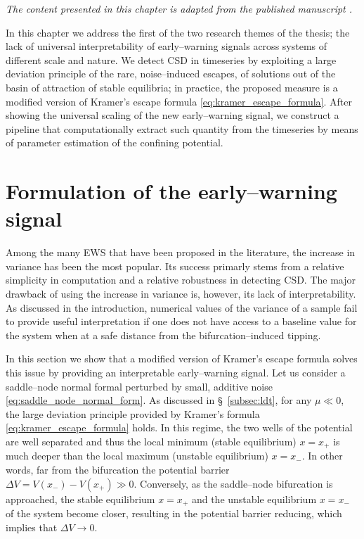 \emph{The content presented in this chapter is adapted from the published manuscript \cite{Papapicco2027}.}
\vspace{1cm}

In this chapter we address the first of the two research themes of the thesis; the lack of universal interpretability of early--warning signals across systems of different scale and nature.
We detect CSD in timeseries by exploiting a large deviation principle of the rare, noise--induced escapes, of solutions out of the basin of attraction of stable equilibria; in practice, the proposed measure is a modified version of Kramer's escape formula \eqref{eq:kramer_escape_formula}.
After showing the universal scaling of the new early--warning signal, we construct a pipeline that computationally extract such quantity from the timeseries by means of parameter estimation of the confining potential.

\section{Formulation of the early--warning signal}\label{sec:formulation_ews}
Among the many EWS that have been proposed in the literature, the increase in variance has been the most popular.
Its success primarly stems from a relative simplicity in computation and a relative robustness in detecting CSD.
The major drawback of using the increase in variance is, however, its lack of interpretability.
As discussed in the introduction, numerical values of the variance of a sample fail to provide useful interpretation if one does not have access to a baseline value for the system when at a safe distance from the bifurcation--induced tipping.

In this section we show that a modified version of Kramer's escape formula solves this issue by providing an interpretable early--warning signal.
Let us consider a saddle--node normal formal perturbed by small, additive noise \eqref{eq:saddle_node_normal_form}. 
As discussed in \S~\ref{subsec:ldt}, for any $\mu\ll0$, the large deviation principle provided by Kramer's formula \eqref{eq:kramer_escape_formula} holds.
In this regime, the two wells of the potential are well separated and thus the local minimum (stable equilibrium) $x=x_+$ is much deeper than the local maximum (unstable equilibrium) $x=x_{-}$.
In other words, far from the bifurcation the potential barrier $\Delta V = V(x_-) - V(x_+) \gg 0$.
Conversely, as the saddle--node bifurcation is approached, the stable equilibrium $x=x_+$ and the unstable equilibrium $x=x_-$ of the system become closer, resulting in the potential barrier reducing, which implies that $\Delta V\to0$.


